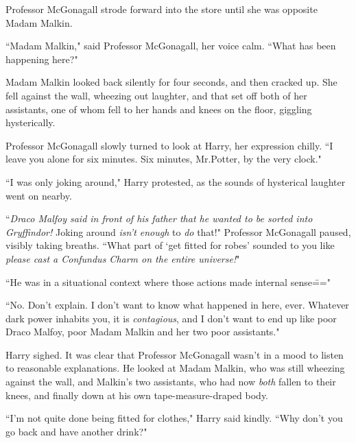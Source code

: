 Professor McGonagall strode forward into the store until she was opposite Madam Malkin.

``Madam Malkin," said Professor McGonagall, her voice calm. ``What has been happening here?"

Madam Malkin looked back silently for four seconds, and then cracked up. She fell against the wall, wheezing out laughter, and that set off both of her assistants, one of whom fell to her hands and knees on the floor, giggling hysterically.

Professor McGonagall slowly turned to look at Harry, her expression chilly. ``I leave you alone for six minutes. Six minutes, Mr.\?Potter, by the very clock."

``I was only joking around," Harry protested, as the sounds of hysterical laughter went on nearby.

``\emph{Draco Malfoy said in front of his father that he wanted to be sorted into Gryffindor!} Joking around \emph{isn't enough} to \emph{do} that!" Professor McGonagall paused, visibly taking breaths. ``What part of `get fitted for robes' sounded to you like \emph{please cast a Confundus Charm on the entire universe!}"

``He was in a situational context where those actions made internal sense\==="

``No. Don't explain. I don't want to know what happened in here, ever. Whatever dark power inhabits you, it is \emph{contagious}, and I don't want to end up like poor Draco Malfoy, poor Madam Malkin and her two poor assistants."

Harry sighed. It was clear that Professor McGonagall wasn't in a mood to listen to reasonable explanations. He looked at Madam Malkin, who was still wheezing against the wall, and Malkin's two assistants, who had now \emph{both} fallen to their knees, and finally down at his own tape-measure-draped body.

``I'm not quite done being fitted for clothes," Harry said kindly. ``Why don't you go back and have another drink?"

